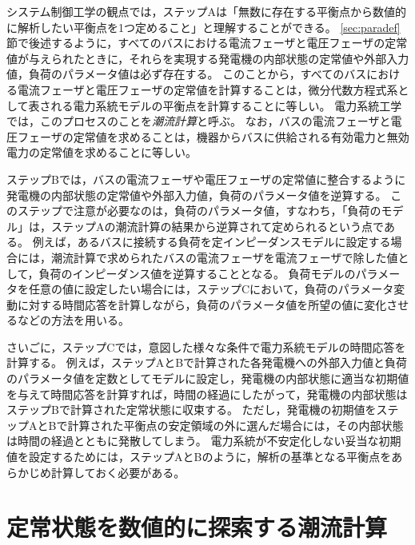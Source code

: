 \documentclass[tombow,dvipdfmx]{corona-a5-1.1}
\begin{document}
システム制御工学の観点では，ステップAは「無数に存在する平衡点から数値的に解析したい平衡点を1つ定めること」と理解することができる。
\ref{sec:paradef}節で後述するように，すべてのバスにおける電流フェーザと電圧フェーザの定常値が与えられたときに，それらを実現する発電機の内部状態の定常値や外部入力値，負荷のパラメータ値は必ず存在する。
このことから，すべてのバスにおける電流フェーザと電圧フェーザの定常値を計算することは，微分代数方程式系として表される電力系統モデルの平衡点を計算することに等しい。
電力系統工学では，このプロセスのことを\emph{潮流計算}と呼ぶ。
なお，バスの電流フェーザと電圧フェーザの定常値を求めることは，機器からバスに供給される有効電力と無効電力の定常値を求めることに等しい。

ステップBでは，バスの電流フェーザや電圧フェーザの定常値に整合するように発電機の内部状態の定常値や外部入力値，負荷のパラメータ値を逆算する。
このステップで注意が必要なのは，負荷のパラメータ値，すなわち，「負荷のモデル」は，ステップAの潮流計算の結果から逆算されて定められるという点である。
例えば，あるバスに接続する負荷を定インピーダンスモデルに設定する場合には，潮流計算で求められたバスの電流フェーザを電流フェーザで除した値として，負荷のインピーダンス値を逆算することとなる。
負荷モデルのパラメータを任意の値に設定したい場合には，ステップCにおいて，負荷のパラメータ変動に対する時間応答を計算しながら，負荷のパラメータ値を所望の値に変化させるなどの方法を用いる。


さいごに，ステップCでは，意図した様々な条件で電力系統モデルの時間応答を計算する。
例えば，ステップAとBで計算された各発電機への外部入力値と負荷のパラメータ値を定数としてモデルに設定し，発電機の内部状態に適当な初期値を与えて時間応答を計算すれば，時間の経過にしたがって，発電機の内部状態はステップBで計算された定常状態に収束する。
ただし，発電機の初期値をステップAとBで計算された平衡点の安定領域の外に選んだ場合には，その内部状態は時間の経過とともに発散してしまう。
電力系統が不安定化しない妥当な初期値を設定するためには，ステップAとBのように，解析の基準となる平衡点をあらかじめ計算しておく必要がある。



\section{定常状態を数値的に探索する潮流計算}\label{sec:powflow}
\end{document}
